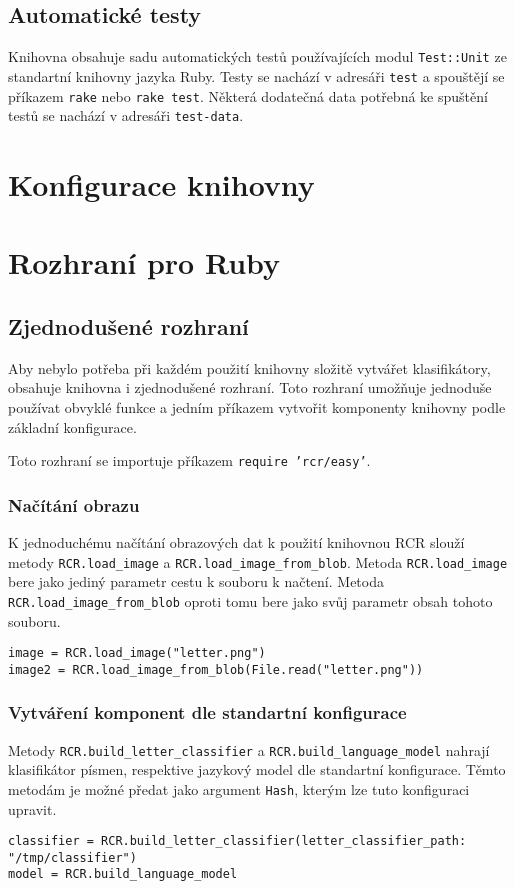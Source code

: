 \documentclass[a4paper]{article}
\begin{document}
\subsection{Automatické testy}
Knihovna obsahuje sadu automatických testů používajících modul
\texttt{Test::Unit} ze standartní knihovny jazyka Ruby.
Testy se nachází v adresáři \texttt{test} a spouštějí se příkazem
\texttt{rake} nebo \texttt{rake test}. Některá dodatečná data potřebná
ke spuštění testů se nachází v adresáři \texttt{test-data}.

\section{Konfigurace knihovny}

\section{Rozhraní pro Ruby}

\subsection{Zjednodušené rozhraní}
Aby nebylo potřeba při každém použití knihovny složitě vytvářet klasifikátory,
obsahuje knihovna i zjednodušené rozhraní. Toto rozhraní umožňuje jednoduše
používat obvyklé funkce a jedním příkazem vytvořit komponenty knihovny podle
základní konfigurace.

Toto rozhraní se importuje příkazem \texttt{require 'rcr/easy'}.

\subsubsection{Načítání obrazu}
K jednoduchému načítání obrazových dat k použití knihovnou RCR slouží metody
\texttt{RCR.load\_image} a \texttt{RCR.load\_image\_from\_blob}. Metoda
\texttt{RCR.load\_image} bere jako jediný parametr cestu k souboru k načtení.
Metoda \texttt{RCR.load\_image\_from\_blob} oproti tomu bere jako svůj parametr
obsah tohoto souboru.
\begin{lstlisting}
image = RCR.load_image("letter.png")
image2 = RCR.load_image_from_blob(File.read("letter.png"))
\end{lstlisting}

\subsubsection{Vytváření komponent dle standartní konfigurace}
Metody \texttt{RCR.build\_letter\_classifier} a
\texttt{RCR.build\_language\_model} nahrají klasifikátor písmen, respektive jazykový model
dle standartní konfigurace. Těmto metodám je možné předat jako argument
\texttt{Hash}, kterým lze tuto konfiguraci upravit.
\begin{lstlisting}
classifier = RCR.build_letter_classifier(letter_classifier_path: "/tmp/classifier")
model = RCR.build_language_model
\end{lstlisting}
\end{document}
